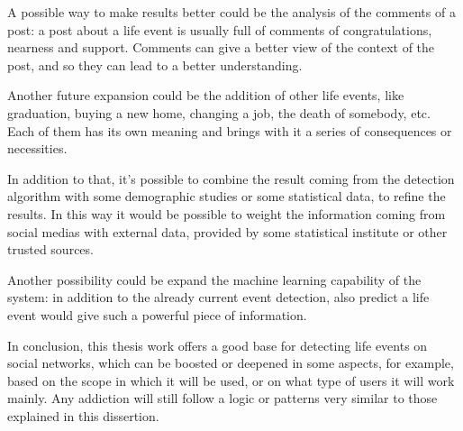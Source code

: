 A possible way to make results better could be the analysis of the comments of a post: a post about a life event is usually full of comments of congratulations, nearness and support. Comments can give a better view of the context of the post, and so they can lead to a better understanding.

Another future expansion could be the addition of other life events, like graduation, buying a new home, changing a job, the death of somebody, etc. Each of them has its own meaning and brings with it a series of consequences or necessities.

In addition to that, it's possible to combine the result coming from the detection algorithm with some demographic studies or some statistical data, to refine the results. In this way it would be possible to weight the information coming from social medias with external data, provided by some statistical institute or other trusted sources.

Another possibility could be expand the machine learning capability of the system: in addition to the already current event detection, also predict a life event would give such a powerful piece of information.

In conclusion, this thesis work offers a good base for detecting life events on social networks, which can be boosted or deepened in some aspects, for example, based on the scope in which it will be used, or on what type of users it will work mainly. Any addiction will still follow a logic or patterns very similar to those explained in this dissertion.
